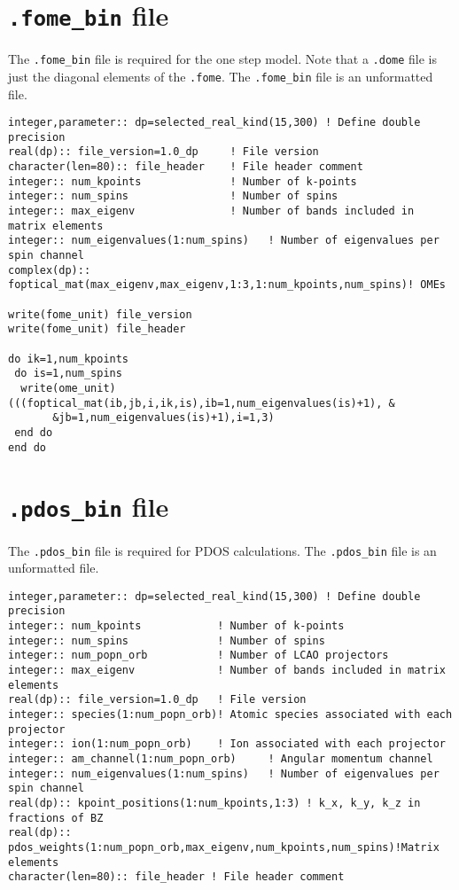 \documentclass[a4paper,11pt,twoside]{book}
\begin{document}
\begin{appendix}
\section{\texttt{.fome\_bin} file}
The \texttt{.fome\_bin} file is required for the one step model. 
%
Note that a \texttt{.dome} file is just the diagonal elements of the \texttt{.fome}.
%
The \texttt{.fome\_bin} file is an unformatted file.
\begin{verbatim}
integer,parameter:: dp=selected_real_kind(15,300) ! Define double precision
real(dp):: file_version=1.0_dp     ! File version
character(len=80):: file_header    ! File header comment
integer:: num_kpoints              ! Number of k-points
integer:: num_spins                ! Number of spins
integer:: max_eigenv               ! Number of bands included in matrix elements
integer:: num_eigenvalues(1:num_spins)   ! Number of eigenvalues per spin channel
complex(dp):: foptical_mat(max_eigenv,max_eigenv,1:3,1:num_kpoints,num_spins)! OMEs

write(fome_unit) file_version
write(fome_unit) file_header

do ik=1,num_kpoints
 do is=1,num_spins
  write(ome_unit) (((foptical_mat(ib,jb,i,ik,is),ib=1,num_eigenvalues(is)+1), &
       &jb=1,num_eigenvalues(is)+1),i=1,3)
 end do
end do
\end{verbatim}

\section{\texttt{.pdos\_bin} file}
The \texttt{.pdos\_bin} file is required for PDOS calculations.
%
The \texttt{.pdos\_bin} file is an unformatted file.
\begin{verbatim}
integer,parameter:: dp=selected_real_kind(15,300) ! Define double precision
integer:: num_kpoints            ! Number of k-points
integer:: num_spins              ! Number of spins
integer:: num_popn_orb           ! Number of LCAO projectors
integer:: max_eigenv             ! Number of bands included in matrix elements
real(dp):: file_version=1.0_dp   ! File version
integer:: species(1:num_popn_orb)! Atomic species associated with each projector
integer:: ion(1:num_popn_orb)    ! Ion associated with each projector
integer:: am_channel(1:num_popn_orb)     ! Angular momentum channel
integer:: num_eigenvalues(1:num_spins)   ! Number of eigenvalues per spin channel
real(dp):: kpoint_positions(1:num_kpoints,1:3) ! k_x, k_y, k_z in fractions of BZ
real(dp):: pdos_weights(1:num_popn_orb,max_eigenv,num_kpoints,num_spins)!Matrix elements
character(len=80):: file_header ! File header comment


\end{verbatim}
\end{appendix}
\end{document}
